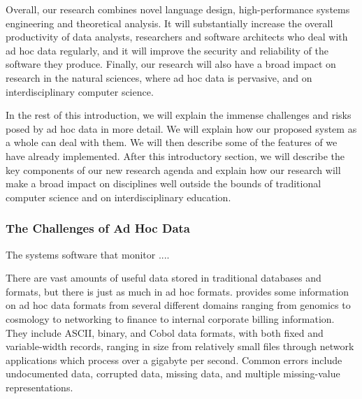 \documentclass[11pt]{article}
\begin{document}
Overall, our research combines novel language design, high-performance
systems engineering and theoretical analysis.  It will substantially
increase the overall productivity of data analysts, researchers and
software architects who deal with ad hoc data regularly, and it will
improve the security and reliability of the software they produce.
Finally, our research will also have a broad impact on research in the
natural sciences, where ad hoc data is pervasive, and on
interdisciplinary computer science.

In the rest of this introduction, we will explain the immense
challenges and risks posed by ad hoc data in more detail.  We will
explain how our proposed system as a whole can deal with them.  We
will then describe some of the features of \pads{} we have already
implemented.  After this introductory section, we will describe the
key components of our new research agenda and explain how our research
will make a broad impact on disciplines well outside the bounds of
traditional computer science and on interdisciplinary education.

\subsubsection{The Challenges of Ad Hoc Data}

The systems software that monitor ....

There are vast amounts of useful data stored in
traditional databases and \xml{} formats, but there is just as much in
ad hoc formats.   provides some information
on ad hoc data formats from several different domains ranging from genomics
to cosmology to networking to finance to internal corporate billing information.  
They include ASCII, binary, and Cobol data formats, with
both fixed and variable-width records, ranging in size from
relatively small files through network applications which process over
a gigabyte per second.  Common errors include undocumented data,
corrupted data, missing data, and multiple missing-value
representations.
\end{document}
